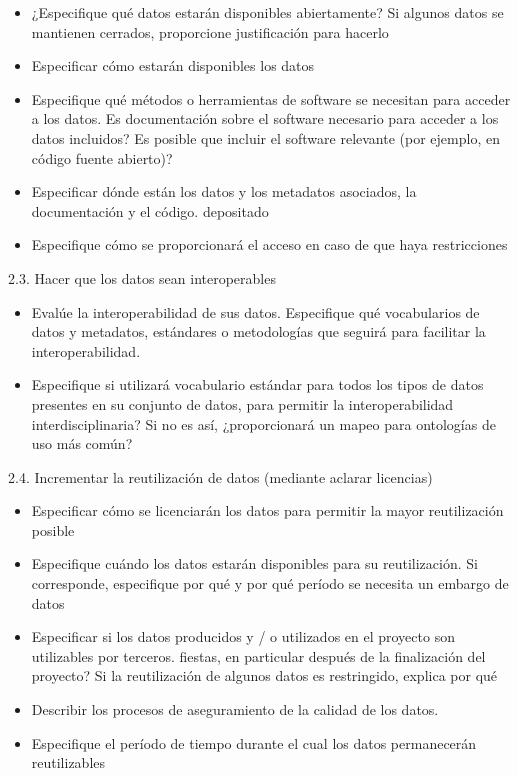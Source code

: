 \documentclass[
  14pt,
]{book}
\providecommand{\tightlist}{%
  \setlength{\itemsep}{0pt}\setlength{\parskip}{0pt}}
\begin{document}
\begin{itemize}
\tightlist
\item
  ¿Especifique qué datos estarán disponibles abiertamente? Si algunos datos se mantienen cerrados, proporcione
  justificación para hacerlo
\item
  Especificar cómo estarán disponibles los datos
\item
  Especifique qué métodos o herramientas de software se necesitan para acceder a los datos. Es
  documentación sobre el software necesario para acceder a los datos incluidos? Es posible que
  incluir el software relevante (por ejemplo, en código fuente abierto)?
\item
  Especificar dónde están los datos y los metadatos asociados, la documentación y el código.
  depositado
\item
  Especifique cómo se proporcionará el acceso en caso de que haya restricciones
\end{itemize}

2.3. Hacer que los datos sean interoperables

\begin{itemize}
\tightlist
\item
  Evalúe la interoperabilidad de sus datos. Especifique qué vocabularios de datos y metadatos,
  estándares o metodologías que seguirá para facilitar la interoperabilidad.
\item
  Especifique si utilizará vocabulario estándar para todos los tipos de datos presentes en su
  conjunto de datos, para permitir la interoperabilidad interdisciplinaria? Si no es así, ¿proporcionará un mapeo para
  ontologías de uso más común?
\end{itemize}

2.4. Incrementar la reutilización de datos (mediante
aclarar licencias)

\begin{itemize}
\tightlist
\item
  Especificar cómo se licenciarán los datos para permitir la mayor reutilización posible
\item
  Especifique cuándo los datos estarán disponibles para su reutilización. Si corresponde, especifique por qué y
  por qué período se necesita un embargo de datos
\item
  Especificar si los datos producidos y / o utilizados en el proyecto son utilizables por terceros.
  fiestas, en particular después de la finalización del proyecto? Si la reutilización de algunos datos es
  restringido, explica por qué
\item
  Describir los procesos de aseguramiento de la calidad de los datos.
\item
  Especifique el período de tiempo durante el cual los datos permanecerán reutilizables
\end{itemize}
\end{document}
